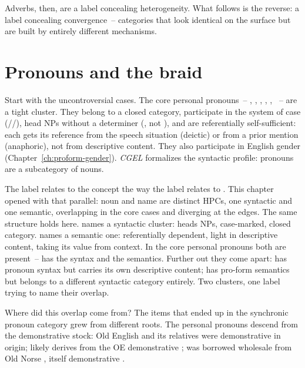 Adverbs, then, are a label concealing heterogeneity. What follows is the reverse: a label concealing convergence~-- categories that look identical on the surface but are built by entirely different mechanisms.


\section{Pronouns and the braid}
\label{sec:11:mimics}

Start with the uncontroversial cases. The core personal pronouns~-- , , , , , ~-- are a tight cluster. They belong to a closed category, participate in the system of case (//), head NPs without a determiner (, not ), and are referentially self-sufficient: each gets its reference from the speech situation (deictic) or from a prior mention (anaphoric), not from descriptive content. They also participate in English gender (Chapter~\ref{ch:proform-gender}). \textit{CGEL} formalizes the syntactic profile: pronouns are a subcategory of nouns.

The label  relates to the concept  the way the label  relates to . This chapter opened with that parallel: noun and name are distinct HPCs, one syntactic and one semantic, overlapping in the core cases and diverging at the edges. The same structure holds here.  names a syntactic cluster: heads NPs, case-marked, closed category.  names a semantic one: referentially dependent, light in descriptive content, taking its value from context. In the core personal pronouns both are present~--  has the syntax and the semantics. Further out they come apart:  has pronoun syntax but carries its own descriptive content;  has pro-form semantics but belongs to a different syntactic category entirely. Two clusters, one label trying to name their overlap.

Where did this overlap come from? The items that ended up in the synchronic pronoun category grew from different roots. The personal pronouns descend from the demonstrative stock: Old English  and its relatives were demonstrative in origin;  likely derives from the OE demonstrative ;  was borrowed wholesale from Old Norse , itself demonstrative \citep[for standard histories, see][]{baugh2002}.

